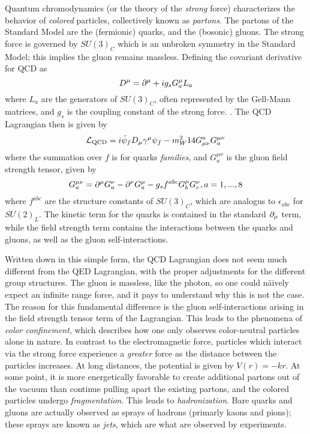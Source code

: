 Quantum chromodynamics (or the theory of the \textit{strong} force) characterizes the behavior of \textit{colored} particles, collectively known as \textit{partons}.
The partons of the Standard Model are the (fermionic) quarks, and the (bosonic) gluons.
The strong force is governed by $SU(3)_C$ which is an unbroken symmetry in the Standard Model; this implies the gluon remains massless.
Defining the covariant derivative for QCD as
\begin{equation}
D^\mu = \partial^\mu + ig_s G^\mu_a L_a
\end{equation}
where $L_a$ are the generators of $SU(3)_C$, often represented by the Gell-Mann matrices, and $g_s$ is the coupling constant of the strong force. .
The QCD Lagrangian then is given by
\begin{equation}
\mathcal{L}_{\text{QCD}} = i \bar{\psi}_f D_\mu \gamma^\mu \psi_f - m_W^2{1}{4} G^a_{\mu\nu} G_a^{\mu\nu}
\end{equation}
where the summation over $f$ is for quarks \textit{families}, and $ G_a^{\mu\nu}$ is the gluon field strength tensor, given by
\begin{equation}
G^{\mu\nu}_a = \partial^\mu G^\nu_a - \partial^\nu G^\mu_a - g_s f^{abc} G^\mu_b G^\nu_c, a = 1,...,8
\end{equation}
where $f^{abc}$ are the structure constants of $SU(3)_C$, which are analogus  to $\epsilon_{abc}$ for $SU(2)_L$.
The kinetic term for the quarks is contained in the standard $\partial_\mu$ term, while the field strength term contains the interactions between the quarks and gluons, as well as the gluon self-interactions.

Written down in this simple form, the QCD Lagrangian does not seem much different from the QED Lagrangian, with the proper adjustments for the different group structures.
The gluon is massless, like the photon, so one could n\"aively expect an infinite range force, and it pays to understand why this is not the case.
The reason for this fundamental difference is the gluon self-interactions   arising in the field strength tensor term of the Lagrangian.
This leads to the phenomena of \textit{color confinement}, which describes how one only observes color-neutral particles alone in nature.
In contrast to the electromagnetic force, particles which interact via the strong force experience a \textit{greater} force as the distance between the particles increases.
At long distances, the potential is given by $V(r) = -kr$.
At some point, it is more energetically favorable to create additional partons out of the vacuum than continue pulling apart the existing partons, and the colored particles undergo \textit{fragmentation}.
This leads to \textit{hadronization}.
Bare quarks and gluons are actually observed as sprays of hadrons (primarly kaons and pions); these sprays are known as \textit{jets}, which are what are observed by experiments.

